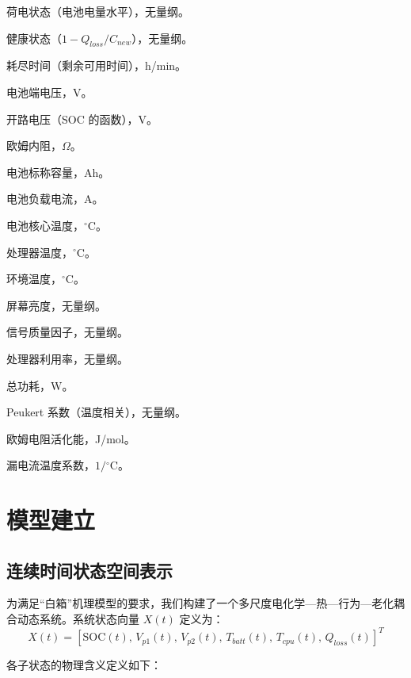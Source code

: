 \documentclass[11pt,a4paper]{ctexart}
\newcommand{\degC}{\ensuremath{^{\circ}\mathrm{C}}}
\begin{document}
\begin{description}[leftmargin=8.5em,labelwidth=8em,itemsep=2pt,parsep=0pt,topsep=0.3em]
\item[$\mathrm{SOC}(t)$] 荷电状态（电池电量水平），无量纲。
\item[$\mathrm{SOH}(t)$] 健康状态（$1-Q_{loss}/C_{new}$），无量纲。
\item[$\mathrm{TTE}$] 耗尽时间（剩余可用时间），h/min。
\item[$V_{term}(t)$] 电池端电压，V。
\item[$V_{OCV}(\mathrm{SOC})$] 开路电压（SOC 的函数），V。
\item[$R_0(\mathrm{SOC},T,\mathrm{SOH})$] 欧姆内阻，$\Omega$。
\item[$C_{nom}$] 电池标称容量，Ah。
\item[$I_{batt}(t)$] 电池负载电流，A。
\item[$T_{batt}(t)$] 电池核心温度，$\degC$。
\item[$T_{cpu}(t)$] 处理器温度，$\degC$。
\item[$T_{amb}$] 环境温度，$\degC$。
\item[$B(t)$] 屏幕亮度，无量纲。
\item[$S(t)$] 信号质量因子，无量纲。
\item[$U(t)$] 处理器利用率，无量纲。
\item[$P_{total}(t)$] 总功耗，W。
\item[$\beta(T)$] Peukert 系数（温度相关），无量纲。
\item[$E_{a,R_0}$] 欧姆电阻活化能，J/mol。
\item[$\gamma$] 漏电流温度系数，$1/\degC$。
\end{description}

\section{模型建立}

\subsection{连续时间状态空间表示}

为满足“白箱”机理模型的要求，我们构建了一个多尺度电化学—热—行为—老化耦合动态系统。系统状态向量 $X(t)$ 定义为：
\begin{equation}
X(t)=\left[\mathrm{SOC}(t),\,V_{p1}(t),\,V_{p2}(t),\,T_{batt}(t),\,T_{cpu}(t),\,Q_{loss}(t)\right]^{T}
\end{equation}

各子状态的物理含义定义如下：
\end{document}
